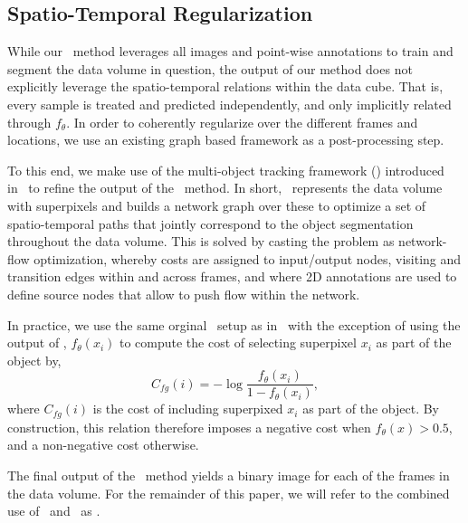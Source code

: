 \subsection{Spatio-Temporal Regularization}
\label{sec:tracking}

While our \SSnnPU~method leverages all images and point-wise annotations to train and segment the data volume in question, the output of our method does not explicitly leverage the spatio-temporal relations within the data cube. That is, every sample is treated and predicted independently, and only implicitly related through $f_\theta$. In order to coherently regularize over the different frames and locations, we use an existing graph based framework as a post-processing step.

To this end, we make use of the multi-object tracking framework (\KSPTrack) introduced in~\cite{lejeune18} to refine the output of the \SSnnPU~method. In short, \KSPTrack~represents the data volume with superpixels and builds a network graph over these to optimize a set of spatio-temporal paths that jointly correspond to the object segmentation throughout the data volume. This is solved by casting the problem as network-flow optimization, whereby costs are assigned to input/output nodes, visiting and transition edges within and across frames, and where 2D annotations are used to define source nodes that allow to push flow within the network.

In practice, we use the same orginal \KSPTrack~setup as in~\cite{lejeune18} with the exception of using the output of \SSnnPU, $f_{\theta}(x_i)$ to compute the cost of selecting superpixel $x_i$ as part of the object by,
\begin{equation}
  \label{eq:cost_fg}
  C_{fg}(i) = -\log \frac{f_\theta(x_i)}{1-f_\theta(x_i)},
\end{equation}
\noindent
where $C_{fg}(i)$ is the cost of including superpixed $x_i$ as part of the object. By construction, this relation therefore imposes a negative cost when $f_{\theta}(x) > 0.5$, and a non-negative cost otherwise. 

The final output of the \KSPTrack~method yields a binary image for each of the frames in the data volume. For the remainder of this paper, we will refer to the combined use of \SSnnPU~and \KSPTrack~as \SSnnPUKSP.

